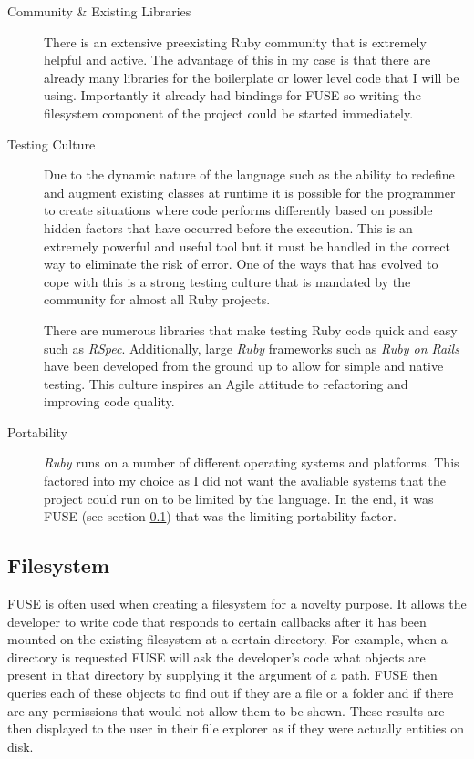 \begin{description}

\item[Community \& Existing Libraries] \hfill

There is an extensive preexisting Ruby community that is extremely helpful and active. The advantage of this in my case is that there are already many libraries for the boilerplate or lower level code that I will be using. Importantly it already had bindings for \ac{FUSE} so writing the filesystem component of the project could be started immediately.

\item[Testing Culture] \hfill

Due to the dynamic nature of the language such as the ability to redefine and augment existing classes at runtime it is possible for the programmer to create situations where code performs differently based on possible hidden factors that have occurred before the execution. This is an extremely powerful and useful tool but it must be handled in the correct way to eliminate the risk of error. One of the ways that has evolved to cope with this is a strong testing culture that is mandated by the community for almost all Ruby projects.

There are numerous libraries that make testing Ruby code quick and easy such as \emph{RSpec}. Additionally, large \emph{Ruby} frameworks such as \emph{Ruby on Rails} have been developed from the ground up to allow for simple and native testing. This culture inspires an Agile attitude to refactoring and improving code quality.

\item[Portability] \hfill

\emph{Ruby} runs on a number of different operating systems and platforms. This factored into my choice as I did not want the avaliable systems that the project could run on to be limited by the language. In the end, it was \ac{FUSE} (see section \ref{ssec:filesystem}) that was the limiting portability factor.

\end{description}

\subsection{Filesystem}
\label{ssec:filesystem}

\ac{FUSE} is often used when creating a filesystem for a novelty purpose. It allows the developer to write code that responds to certain callbacks after it has been mounted on the existing filesystem at a certain directory. For example, when a directory is requested \ac{FUSE} will ask the developer's code what objects are present in that directory by supplying it the argument of a path. \ac{FUSE} then queries each of these objects to find out if they are a file or a folder and if there are any permissions that would not allow them to be shown. These results are then displayed to the user in their file explorer as if they were actually entities on disk.

